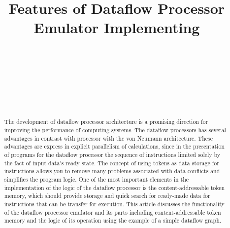 \documentclass[
11pt,%
tightenlines,%
twoside,%
onecolumn,%
nofloats,%
nobibnotes,%
nofootinbib,%
superscriptaddress,%
noshowpacs,%
centertags]%
{revtex4}
\begin{document}

\title{Features of Dataflow Processor Emulator Implementing}

\author{~}

\author{~}

\author{~}

\author{~}



\begin{abstract}
The development of dataflow processor architecture is a promising direction for improving the performance of computing systems.
The dataflow processors has several advantages in contrast with processor with the von Neumann architecture. 
These advantages are express in explicit parallelism of calculations, since in the presentation of programs for the dataflow processor the sequence of instructions limited solely by the fact of input data’s ready state.
The concept of using tokens as data storage for instructions allows you to remove many problems associated with data conflicts and simplifies the program logic.
One of the most important elements in the implementation of the logic of the dataflow processor is the content-addressable token memory, which should provide storage and quick search for ready-made data for instructions that can be transfer for execution.
This article discusses the functionality of the dataflow processor emulator and its parts including content-addressable token memory and the logic of its operation using the example of a simple dataflow graph.
\end{abstract}
\end{document}
